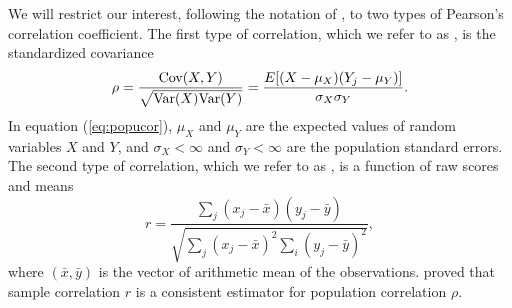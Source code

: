 	We will restrict our interest, following the notation of 
	\citet{lee1988thirteen},  to two 
	types of Pearson's correlation coefficient. The first type of correlation, which we refer to as 
	\textit{\popucor}, is the standardized 
	covariance
	\begin{equation}\label{eq:popucor}
	\rho =\dfrac{\text{Cov}(X, Y)}{\sqrt{\text{Var}(X)\text{Var}(Y)}} = 
	\dfrac{E[(X-\mu_X)(Y_j-\mu_Y)]}{\sigma_X\sigma_Y}.
	\end{equation} 
	In equation (\ref{eq:popucor}), $\mu_X$ and $\mu_Y$ are the expected values of 
	random variables 
	$X$ and 
	$Y$,  and $\sigma_X<\infty$ and 
	$\sigma_Y<\infty$ are the population standard errors. The second type of correlation, which we 
	refer to as \textit{\samplecor}, is a function of raw scores and means
	\begin{equation}\label{eq:samplecor}
	r  =  \dfrac{\sum_j (x_j -\bar{x})(y_j - \bar{y})}{\sqrt{\sum_{j}(x_j - \bar{x})^2\sum_i(y_j - 
			\bar{y})^2}}, 
	\end{equation}
	where $(\bar{x}, \bar{y})$ is the vector of arithmetic mean of the observations. 
	\citet{fisher1915frequency} proved that sample correlation $r$ is a consistent 
	estimator for 
	population correlation $\rho$.
	
